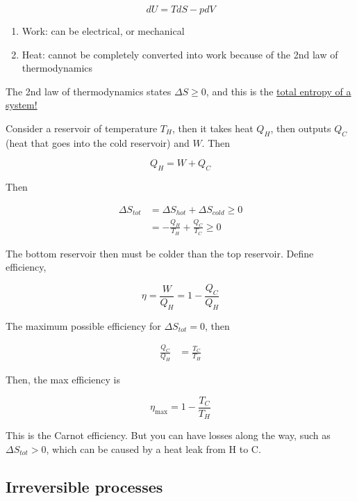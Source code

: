 \documentclass{article}
\newtheorem{one minute paper}[theorem]{One Minute Paper}
\begin{document}
\begin{equation}
    dU = TdS - pdV
\end{equation}

\begin{enumerate}
    \item Work: can be electrical, or mechanical
    \item Heat: cannot be completely converted into work because of the 2nd law of thermodynamics
\end{enumerate}

The 2nd law of thermodynamics states $\Delta S \geq 0$, and this is the \underline{total entropy of a system!}

Consider a reservoir of temperature $T_H$, then it takes heat $Q_H$, then outputs $Q_C$ (heat that goes into the cold reservoir) and $W$. Then 

\begin{equation}
    Q_H = W + Q_C
\end{equation}

Then 

\begin{align}
    \Delta S_{tot} &= \Delta S_{hot} + \Delta S_{cold} \geq 0 \\
    &= -\frac{Q_H}{T_H} + \frac{Q_C}{T_C} \geq 0
\end{align}

The bottom reservoir then must be colder than the top reservoir. Define efficiency, 

\begin{equation}
    \eta = \frac{W}{Q_H} = 1 - \frac{Q_C}{Q_H}
\end{equation}

The maximum possible efficiency for $\Delta S_{tot} = 0$, then 

\begin{align}
    \frac{Q_C}{Q_H} &= \frac{T_C}{T_H}
\end{align}

Then, the max efficiency is 

\begin{equation}
    \eta_{\max} = 1 - \frac{T_C}{T_H}
\end{equation}

This is the Carnot efficiency. But you can have losses along the way, such as $\Delta S_{tot} > 0$, which can be caused by a heat leak from H to C. 

\subsection*{Irreversible processes}
\end{document}
